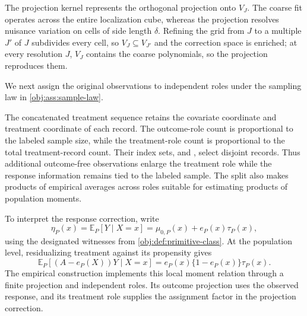 The projection kernel  represents the orthogonal projection  onto \(V_J\). The coarse fit operates across the entire localization cube, whereas the projection resolves nuisance variation on cells of side length \(\delta\). Refining the grid from \(J\) to a multiple \(J'\) of \(J\) subdivides every cell, so \(V_J\subseteq V_{J'}\) and the correction space is enriched; at every resolution \(J\), \(V_J\) contains the coarse polynomials, so the projection reproduces them.

We next assign the original observations to independent roles under the sampling law in \cref{obj:ass:sample-law}.

The concatenated treatment sequence  retains the covariate coordinate  and treatment coordinate  of each record. The outcome-role count  is proportional to the labeled sample size, while the treatment-role count  is proportional to the total treatment-record count. Their index sets,  and , select disjoint records. Thus additional outcome-free observations enlarge the treatment role while the response information remains tied to the labeled sample. The split also makes products of empirical averages across roles suitable for estimating products of population moments.

To interpret the response correction, write
\[
\eta_P(x)=\mathbb E_P[Y\mid X=x]
=\mu_{0,P}(x)+e_P(x)\tau_P(x),
\]
using the designated witnesses from \cref{obj:def:primitive-class}. At the population level, residualizing treatment against its propensity gives
\[
\mathbb E_P[(A-e_P(X))Y\mid X=x]
=e_P(x)\{1-e_P(x)\}\tau_P(x).
\]
The empirical construction implements this local moment relation through a finite projection and independent roles. Its outcome projection uses the observed response, and its treatment role supplies the assignment factor in the projection correction.

